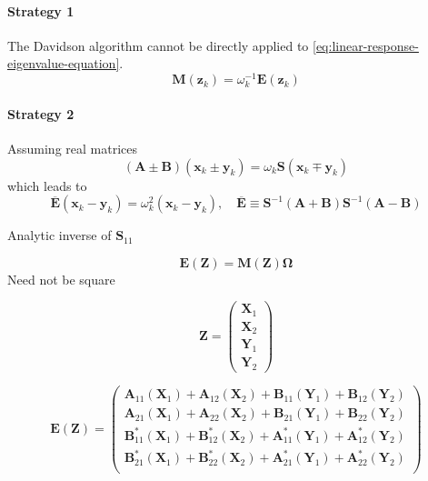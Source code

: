 \paragraph{Strategy 1}
The Davidson algorithm cannot be directly applied to
\cref{eq:linear-response-eigenvalue-equation}.
\begin{equation}
    \mathbf{M}(\mathbf{z}_k)
    =
    \omega_k^{-1}
    \mathbf{E}(\mathbf{z}_k)
\end{equation}


\paragraph{Strategy 2}
Assuming real matrices
\begin{equation}
    (\mathbf{A} \pm \mathbf{B})
    (\mathbf{x}_k  \pm \mathbf{y}_k)
    =
    \omega_k
    \mathbf{S}
    (\mathbf{x}_k \mp \mathbf{y}_k)
\end{equation}
which leads to
\begin{equation}
    \overline{\mathbf{E}}
    (\mathbf{x}_k - \mathbf{y}_k)
    =
    \omega_k^2
    (\mathbf{x}_k - \mathbf{y}_k)
    ,
    \quad
    \overline{\mathbf{E}}
    \equiv
    \mathbf{S}^{-1}
    (\mathbf{A} + \mathbf{B})
    \mathbf{S}^{-1}
    (\mathbf{A} - \mathbf{B})
\end{equation}

Analytic inverse of \(\mathbf{S}_{11}\)


\begin{equation}
    \mathbf{E}(\mathbf{Z})
    =
    \mathbf{M}(\mathbf{Z})
    \boldsymbol{\Omega}
\end{equation}
Need not be square

\begin{equation}
    \mathbf{Z}
    =
    \begin{pmatrix}
        \mathbf{X}_1 \\
        \mathbf{X}_2 \\
        \mathbf{Y}_1 \\
        \mathbf{Y}_2
    \end{pmatrix}
\end{equation}

\begin{equation}
    \mathbf{E}(\mathbf{Z})
    =
    \begin{pmatrix}
        \mathbf{A}_{11}(\mathbf{X}_1) +
        \mathbf{A}_{12}(\mathbf{X}_2) +
        \mathbf{B}_{11}(\mathbf{Y}_1) +
        \mathbf{B}_{12}(\mathbf{Y}_2) \\
        \mathbf{A}_{21}(\mathbf{X}_1) +
        \mathbf{A}_{22}(\mathbf{X}_2) +
        \mathbf{B}_{21}(\mathbf{Y}_1) +
        \mathbf{B}_{22}(\mathbf{Y}_2) \\
        \mathbf{B}^*_{11}(\mathbf{X}_1) +
        \mathbf{B}^*_{12}(\mathbf{X}_2) +
        \mathbf{A}^*_{11}(\mathbf{Y}_1) +
        \mathbf{A}^*_{12}(\mathbf{Y}_2) \\
        \mathbf{B}^*_{21}(\mathbf{X}_1) +
        \mathbf{B}^*_{22}(\mathbf{X}_2) +
        \mathbf{A}^*_{21}(\mathbf{Y}_1) +
        \mathbf{A}^*_{22}(\mathbf{Y}_2) \\
    \end{pmatrix}
\end{equation}



